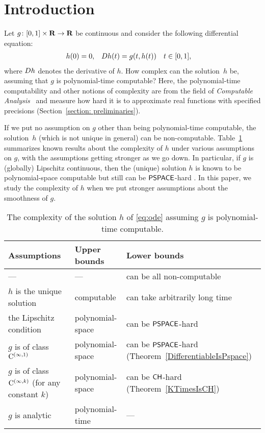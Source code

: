 \section{Introduction}

Let $g \colon [0,1] \times \mathbf R \to \mathbf R$ be continuous 
and consider the following differential equation: 
\begin{align}
 \label{eq:ode}
 h(0) & = 0, &
 D h(t) & = g(t,h(t)) \quad t \in [0,1], 
\end{align}
where $D h$ denotes the derivative of $h$. 
How complex can the solution~$h$ be, 
assuming that $g$ is polynomial-time computable? 
Here, the polynomial-time computability 
and other notions of complexity 
are from the field of 
\emph{Computable Analysis}~\cite{weihrauch00:_comput_analy}
and measure how hard it is to 
approximate real functions with specified precisions 
(Section~\ref{section: preliminaries}). 

If we put no assumption on $g$ other than being polynomial-time computable, 
the solution~$h$ (which is not unique in general) can be non-computable. 
Table~\ref{table:related} summarizes known results about 
the complexity of $h$ under various assumptions on $g$, 
with the assumptions getting stronger as we go down. 
In particular, if $g$ is (globally) Lipschitz continuous, 
then the (unique) solution $h$ is known to be 
polynomial-space computable but still can be 
$\mathsf{PSPACE}$-hard \cite{kawamura2010lipschitz}. 
In this paper, we study the complexity of $h$ 
when we put stronger assumptions about 
the smoothness of $g$. 

\begin{table}
\renewcommand\arraystretch{1.3}
\begin{center}
 \caption{The complexity of the solution $h$ of \eqref{eq:ode}
 assuming $g$ is polynomial-time computable.}
 \label{table:related}
 \begin{tabular}{lll}
  Assumptions & Upper bounds & Lower bounds \\
  \hline
   --- & --- & can be all non-computable \cite{pour1979computable} \\
  $h$ is the unique solution & computable \cite{coddington1955theory}
  & can take arbitrarily long time \cite{ko1983computational,miller1970recursive} \\
  the Lipschitz condition  & polynomial-space \cite{ko1983computational}
      &	can be $\mathsf{PSPACE}$-hard \cite{kawamura2010lipschitz}\\
  $g$ is of class $\mathrm C ^{(\infty, 1)}$ & polynomial-space 
      & \parbox[t]{11em}{can be $\mathsf{PSPACE}$-hard\\{}(Theorem~\ref{DifferentiableIsPspace})} \\
  \parbox[t]{11em}{$g$ is of class $\mathrm C ^{(\infty, k)}$\\{}(for any constant $k$)}
  & polynomial-space & \parbox[t]{11em}{can be $\mathsf{CH}$-hard\\{}(Theorem~\ref{KTimesIsCH})} \\
  $g$ is analytic
  & polynomial-time \cite{muller1987uniform,ko1988computing} 
  & ---
 \end{tabular}
\end{center}
\end{table}

